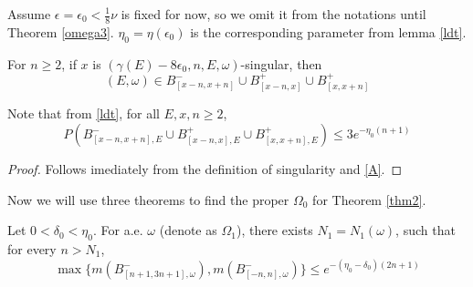 Assume $\epsilon=\epsilon_0<\frac{1}{8}\nu$ is fixed for now, so we omit it from the notations until Theorem \ref{omega3}. $\eta_0=\eta(\epsilon_0)$ is the corresponding parameter from lemma \ref{ldt}.
\begin{lemma}\label{lemma1}
For $n \geq 2$, if $x$ is $(\gamma(E)-8\epsilon_0,n,E,\omega)$-singular, then
\[(E,\omega)\in B_{[x-n,x+n]}^-\cup B_{[x-n,x]}^+\cup B_{[x,x+n]}^+
\]
\end{lemma}
\begin{remark}
  Note that from \eqref{ldt}, for all $E,x,n\geq 2$,
  \[
    P(B_{[x-n,x+n],E}^-\cup B_{[x-n,x],E}^+\cup B_{[x,x+n],E}^+)\leq 3e^{-\eta_0 (n+1)}
  \]
\end{remark}
\begin{proof}
Follows imediately from the definition of singularity and \eqref{A}.
\end{proof}

Now we will use three theorems to find the proper $\Omega_0$ for Theorem \ref{thm2}.
\begin{thm}\label{omega1}
  Let $0<\delta_0<\eta_0$. For a.e. $\omega$ (denote as $\Omega_1$), there exists $ N_1=N_1(\omega)$, such that for every $ n>N_1$,
  \[
  \max\{m(B_{[n+1,3n+1],\omega}^-),m(B_{[-n,n],\omega}^-)\}\leq e^{-(\eta_0-\delta_0)(2n+1)}
  \]
\end{thm}

